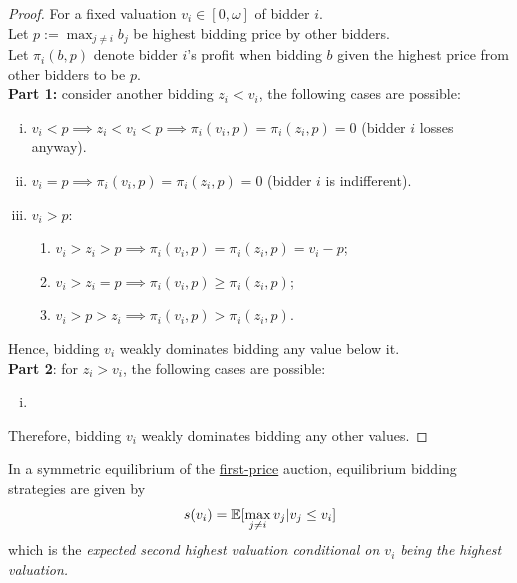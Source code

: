\documentclass{article}
\begin{document}
	\begin{proof}
		For a fixed valuation $v_i \in [0, \omega]$ of bidder $i$. \\
		Let $p := \max_{j \neq i} b_j$ be highest bidding price by other bidders. \\
		Let $\pi_i(b, p)$ denote bidder $i$'s profit when bidding $b$ given the highest price from other bidders to be $p$. \\
		\textbf{Part 1:} consider another bidding $z_i < v_i$, the following cases are possible: 
		\begin{enumerate}[(i)]
			\item $v_i < p \implies z_i < v_i < p \implies \pi_i(v_i, p) = \pi_i(z_i, p) = 0$ (bidder $i$ losses anyway).
			\item $v_i = p \implies \pi_i(v_i, p) = \pi_i(z_i, p) = 0$ (bidder $i$ is indifferent).
			\item $v_i > p$:
			\begin{enumerate}
				\item $v_i > z_i > p \implies \pi_i(v_i, p) = \pi_i(z_i, p) = v_i - p$;
				\item $v_i > z_i = p \implies \pi_i(v_i, p) \geq \pi_i(z_i, p)$;
				\item $v_i > p > z_i \implies \pi_i(v_i, p) > \pi_i(z_i, p)$.
			\end{enumerate}
		\end{enumerate}
		Hence, bidding $v_i$ weakly dominates bidding any value below it. \\
		\textbf{Part 2}: for $z_i > v_i$, the following cases are possible:
		\begin{enumerate}[(i)]
			\item {}
		\end{enumerate}
		Therefore, bidding $v_i$ weakly dominates bidding any other values.
	\end{proof}
	
	\begin{proposition}
		In a symmetric equilibrium of the \ul{first-price} auction, equilibrium bidding strategies are given by
		\begin{align}
			s(v_i) = \mathbb{E}[{\max_{j \neq i} v_j | v_j \leq v_i}]
		\end{align}
		which is the \emph{expected second highest valuation conditional on $v_i$ being the highest valuation.}
	\end{proposition}
	
\end{document}
